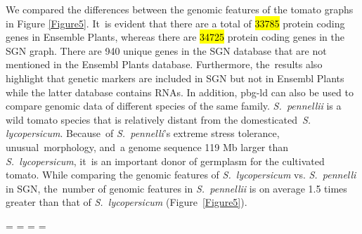 \documentclass[applsci,article,accept,moreauthors,pdftex]{Definitions/mdpi}
\begin{document}
{\begin{enumerate}[label=(\Roman*),leftmargin=*,labelsep=0mm]
We compared %
the differences between the genomic features of the tomato graphs in Figure \ref{Figure5}. %
It~is %
evident that there are a total of \hl{33785}  %
protein coding genes in Ensemble Plants, whereas there are \hl{34725} protein coding genes in the SGN graph. There are 940 unique %
genes in the SGN database that are not mentioned in the Ensembl Plants database. Furthermore, the~results also highlight that genetic markers are included in SGN but not in Ensembl Plants while the latter database contains RNAs.    
In addition, %
pbg-ld can also be used to compare genomic data of different species of the same family. \textit{S.~pennellii} is a wild tomato species that is relatively distant from the domesticated~\textit{S. lycopersicum}. %
Because~of \textit{S.~pennelli}’s extreme stress tolerance, unusual~morphology, and~a genome sequence 119 Mb larger than %
\textit{S.~lycopersicum}, it~is an important donor of germplasm for the cultivated tomato.
While comparing the genomic features of %
\textit{S.~lycopersicum} vs. \textit{S.~pennelli} in SGN, %
the~number of genomic features in \textit{S.~pennellii} is on average 1.5 times greater than that of \textit{S.~lycopersicum} (Figure~\ref{Figure5}). %
\end{enumerate}
\newpage
\paperwidth=\pdfpageheight
\paperheight=\pdfpagewidth
\pdfpageheight=\paperheight
\pdfpagewidth=\paperwidth
{}
\fancyheadoffset[LO,RE]{0cm}
\fancyheadoffset[RO,LE]{0cm}

}
\end{document}
